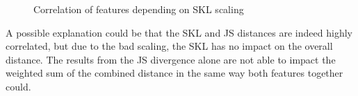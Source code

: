 \begin{figure}[htbp]
	\centering
	\caption{Correlation of features depending on SKL scaling}
	\label{fig:sklsc}
\end{figure}
\FloatBarrier

\noindent A possible explanation could be that the SKL and JS distances are indeed highly correlated, but due to the bad scaling, the SKL has no impact on the overall distance. The results from the JS divergence alone are not able to impact the weighted sum of the combined distance in the same way both features together could. 

